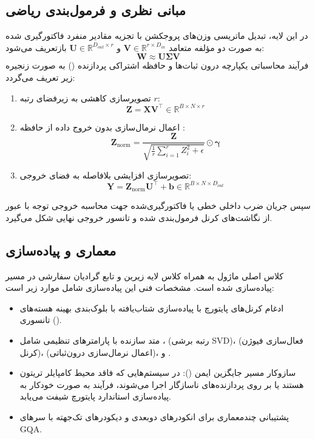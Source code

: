 \subsection{مبانی نظری و فرمول‌بندی ریاضی}
در این لایه، تبدیل ماتریسی وزن‌های پروجکشن با تجزیه مقادیر منفرد فاکتورگیری شده به صورت دو مؤلفه متعامد $\mathbf{V} \in \mathbb{R}^{r \times D_{in}}$ و $\mathbf{U} \in \mathbb{R}^{D_{out} \times r}$ بازتعریف می‌شود:
\begin{equation}
\mathbf{W} \approx \mathbf{U} \mathbf{\Sigma} \mathbf{V}
\end{equation}
فرآیند محاسباتی یکپارچه درون ثبات‌ها و حافظه اشتراکی پردازنده () به صورت زنجیره زیر تعریف می‌گردد:
\begin{enumerate}
    \item تصویرسازی کاهشی به زیرفضای رتبه $r$:
    \begin{equation}
    \mathbf{Z} = \mathbf{X} \mathbf{V}^\top \in \mathbb{R}^{B \times N \times r}
    \end{equation}
    \item اعمال نرمال‌سازی  بدون خروج داده از حافظه :
    \begin{equation}
    \mathbf{Z}_{\text{norm}} = \frac{\mathbf{Z}}{\sqrt{\frac{1}{r} \sum_{i=1}^r Z_i^2 + \epsilon}} \odot \boldsymbol{\gamma}
    \end{equation}
    \item تصویرسازی افزایشی بلافاصله به فضای خروجی:
    \begin{equation}
    \mathbf{Y} = \mathbf{Z}_{\text{norm}} \mathbf{U}^\top + \mathbf{b} \in \mathbb{R}^{B \times N \times D_{out}}
    \end{equation}
\end{enumerate}
سپس جریان ضرب داخلی خطی یا فاکتورگیری‌شده جهت محاسبه خروجی توجه با عبور از نگاشت‌های کرنل فرمول‌بندی شده و تانسور خروجی نهایی شکل می‌گیرد.

\subsection{معماری و پیاده‌سازی}
کلاس اصلی ماژول  به همراه کلاس لایه زیرین  و تابع گرادیان سفارشی  در مسیر  پیاده‌سازی شده است. مشخصات فنی این پیاده‌سازی شامل موارد زیر است:
\begin{itemize}
    \item ادغام کرنل‌های پایتورچ با پیاده‌سازی شتاب‌یافته  با بلوک‌بندی بهینه هسته‌های تانسوری ().
    \item متد سازنده با پارامترهای تنظیمی شامل ،  (رتبه برشی SVD)،  (فعال‌سازی فیوژن کرنل)،  (اعمال نرمال‌سازی درون‌ثباتی)، و .
    \item سازوکار مسیر جایگزین ایمن (): در سیستم‌هایی که فاقد محیط کامپایلر تریتون هستند یا بر روی پردازنده‌های ناسازگار اجرا می‌شوند، فرآیند به صورت خودکار به پیاده‌سازی استاندارد پایتورچ شیفت می‌یابد.
    \item پشتیبانی چندمعماری برای انکودرهای دوبعدی و دیکودرهای تک‌جهته با سرهای GQA.
\end{itemize}

